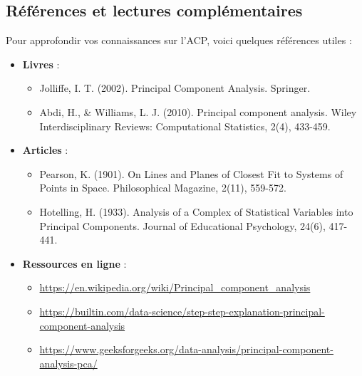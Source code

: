\documentclass[10pt,a4paper]{article}
\begin{document}
\subsection*{Références et lectures complémentaires}
Pour approfondir vos connaissances sur l'ACP, voici quelques références utiles :
\begin{itemize}
    \item \textbf{Livres} :
    \begin{itemize}
        \item Jolliffe, I. T. (2002). Principal Component Analysis. Springer.
        \item Abdi, H., \& Williams, L. J. (2010). Principal component analysis. Wiley Interdisciplinary Reviews: Computational Statistics, 2(4), 433-459.
    \end{itemize}
    \item \textbf{Articles} :
    \begin{itemize}
        \item Pearson, K. (1901). On Lines and Planes of Closest Fit to Systems of Points in Space. Philosophical Magazine, 2(11), 559-572.
        \item Hotelling, H. (1933). Analysis of a Complex of Statistical Variables into Principal Components. Journal of Educational Psychology, 24(6), 417-441.
    \end{itemize}
    \item \textbf{Ressources en ligne} :
    \begin{itemize}
        \item \url{https://en.wikipedia.org/wiki/Principal_component_analysis}
        \item \url{https://builtin.com/data-science/step-step-explanation-principal-component-analysis}
        \item \url{https://www.geeksforgeeks.org/data-analysis/principal-component-analysis-pca/}
    \end{itemize}
\end{itemize}
\end{document}
